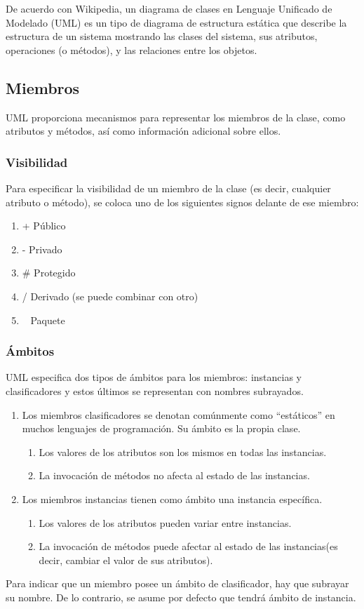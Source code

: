 De acuerdo con Wikipedia\cite{wikipedia_diagrama_2020}, un diagrama de clases en Lenguaje Unificado de Modelado (UML) es un tipo de diagrama de estructura estática que describe la estructura de un sistema mostrando las clases del sistema, sus atributos, operaciones (o métodos), y las relaciones entre los objetos.


\subsection*{Miembros}
UML proporciona mecanismos para representar los miembros de la clase, como atributos y métodos, así como información adicional sobre ellos.


\subsubsection*{Visibilidad}
Para especificar la visibilidad de un miembro de la clase (es decir, cualquier atributo o método), se coloca uno de los siguientes signos delante de ese miembro:

\begin{enumerate}
    \item +	Público
    \item -	Privado
    \item \# Protegido
    \item /	Derivado (se puede combinar con otro)
    \item ~	Paquete
\end{enumerate}

\subsubsection*{Ámbitos}

UML especifica dos tipos de ámbitos para los miembros: instancias y clasificadores y estos últimos se representan con nombres subrayados.

\begin{enumerate}
    \item Los miembros clasificadores se denotan comúnmente como “estáticos” en muchos lenguajes de programación. Su ámbito es la propia clase.
    \begin{enumerate}
        \item Los valores de los atributos son los mismos en todas las instancias.
        \item La invocación de métodos no afecta al estado de las instancias.
    \end{enumerate}
    \item Los miembros instancias tienen como ámbito una instancia específica.
\begin{enumerate}
    \item Los valores de los atributos pueden variar entre instancias.
    \item La invocación de métodos puede afectar al estado de las instancias(es decir, cambiar el valor de sus atributos).
\end{enumerate}
\end{enumerate}
Para indicar que un miembro posee un ámbito de clasificador, hay que subrayar su nombre. De lo contrario, se asume por defecto que tendrá ámbito de instancia.

